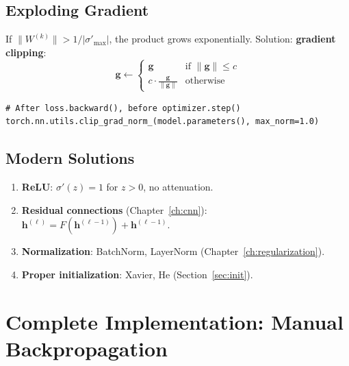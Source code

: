 \subsection{Exploding Gradient}

If $\|W^{(k)}\| > 1/|\sigma'_{\max}|$, the product grows exponentially. Solution: \textbf{gradient clipping}:
\[
\bm{g} \leftarrow \begin{cases}
\bm{g} & \text{if } \|\bm{g}\| \leq c \\
c \cdot \frac{\bm{g}}{\|\bm{g}\|} & \text{otherwise}
\end{cases}
\]

\begin{codeblock}[title=\textbf{Gradient Clipping in PyTorch}]
\begin{verbatim}
# After loss.backward(), before optimizer.step()
torch.nn.utils.clip_grad_norm_(model.parameters(), max_norm=1.0)
\end{verbatim}
\end{codeblock}

\subsection{Modern Solutions}

\begin{enumerate}
\item \textbf{ReLU}: $\sigma'(z) = 1$ for $z > 0$, no attenuation.
\item \textbf{Residual connections} (Chapter~\ref{ch:cnn}): $\bm{h}^{(\ell)} = F(\bm{h}^{(\ell-1)}) + \bm{h}^{(\ell-1)}$.
\item \textbf{Normalization}: BatchNorm, LayerNorm (Chapter~\ref{ch:regularization}).
\item \textbf{Proper initialization}: Xavier, He (Section~\ref{sec:init}).
\end{enumerate}

\section{Complete Implementation: Manual Backpropagation}
\label{sec:backprop_manual}

